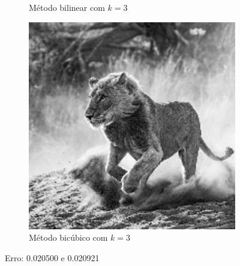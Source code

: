 \documentclass[leqno]{article}
\begin{document}
\begin{figure}[H]
\begin{subfigure}{.33\textwidth}
      \caption{Método bilinear com $k = 3$}
      \label{fig:sub2}
    \end{subfigure}
    \begin{subfigure}{.33\textwidth}
        \centering
        \includegraphics[width=.7\linewidth]{../images/leaopb_bic.png}
        \caption{Método bicúbico com $k = 3$}
        \label{fig:sub1}
      \end{subfigure}%
    \caption{Erro: 0.020500 e 0.020921}
    \label{fig:test}
\end{figure}
\end{document}
